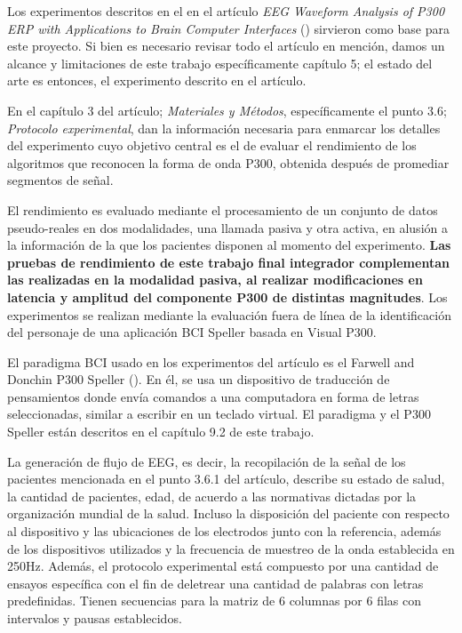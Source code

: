 \documentclass[../00_Main.tex]{subfiles}
\begin{document}
Los experimentos descritos en el en el artículo \textit{EEG Waveform Analysis of P300 ERP with Applications to Brain Computer Interfaces} (\cite{EEGAnalysisBCI}) sirvieron como base para este proyecto. Si bien es necesario revisar todo el artículo en mención, damos un alcance y limitaciones de este trabajo específicamente capítulo 5; el estado del arte es entonces, el experimento descrito en el artículo. 

En el capítulo 3 del artículo; \textit{Materiales y Métodos}, específicamente el punto 3.6;  \textit{Protocolo experimental}, dan la información necesaria para enmarcar los detalles del experimento cuyo objetivo central es el de evaluar el rendimiento de los algoritmos que reconocen la forma de onda P300, obtenida después de promediar segmentos de señal.

El rendimiento es evaluado mediante el procesamiento de un conjunto de datos pseudo-reales en dos modalidades, una llamada pasiva y otra activa, en alusión a la información de la que los pacientes disponen al momento del experimento. \textbf{Las pruebas de rendimiento de este trabajo final integrador complementan las realizadas en la modalidad pasiva, al realizar modificaciones en latencia y amplitud del componente P300 de distintas magnitudes}. Los experimentos se realizan mediante la evaluación fuera de línea de la identificación del personaje de una aplicación BCI Speller basada en Visual P300.

El paradigma BCI usado en los experimentos del artículo es el Farwell and Donchin P300 Speller (\cite{Talkinghead}). En él, se usa un dispositivo de traducción de pensamientos donde envía comandos a una computadora en forma de letras seleccionadas, similar a escribir en un teclado virtual. El paradigma y el P300 Speller están descritos en el capítulo 9.2 de este trabajo.

La generación de flujo de EEG, es decir, la recopilación de la señal de los pacientes mencionada en el punto 3.6.1 del artículo, describe su estado de salud, la cantidad de pacientes, edad, de acuerdo a las normativas dictadas por la organización mundial de la salud. Incluso la disposición del paciente con respecto al dispositivo y las ubicaciones de los electrodos junto con la referencia, además de los dispositivos utilizados y la frecuencia de muestreo de la onda establecida en 250Hz.
Además, el protocolo experimental está compuesto por una cantidad de ensayos específica con el fin de deletrear una cantidad de palabras con letras predefinidas. Tienen secuencias para la matriz de 6 columnas por 6 filas con intervalos y pausas establecidos. 
\end{document}
